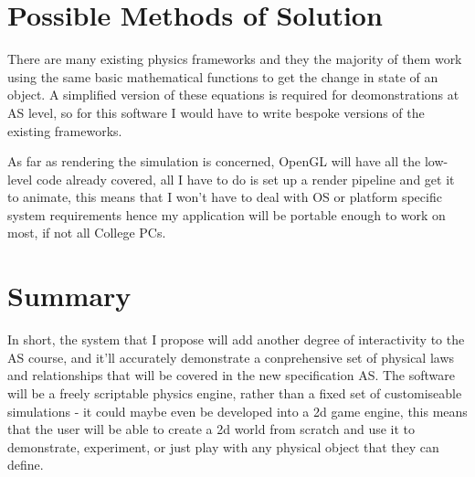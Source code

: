 \section{Possible Methods of Solution}
	There are many existing physics frameworks and they the majority of them work using the same basic mathematical functions to get the change in state of an object. A simplified version of these equations is required for deomonstrations at AS level, so for this software I would have to write bespoke versions of the existing frameworks.

	As far as rendering the simulation is concerned, OpenGL will have all the low-level code already covered, all I have to do is set up a render pipeline and get it to animate, this means that I won't have to deal with OS or platform specific system requirements hence my application will be portable enough to work on most, if not all College PCs.


\section{Summary}
In short, the system that I propose will add another degree of interactivity to the AS course, and it'll accurately demonstrate a conprehensive set of physical laws and relationships that will be covered in the new specification AS. The software will be a freely scriptable physics engine, rather than a fixed set of customiseable simulations - it could maybe even be developed into a 2d game engine, this means that the user will be able to create a 2d world from scratch and use it to demonstrate, experiment, or just play with any physical object that they can define.
